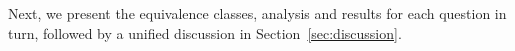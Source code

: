 Next, we present the equivalence classes, analysis and results for each  question in turn, followed by a unified discussion in Section~\ref{sec:discussion}. 



%
%
%
%
%
%
%






